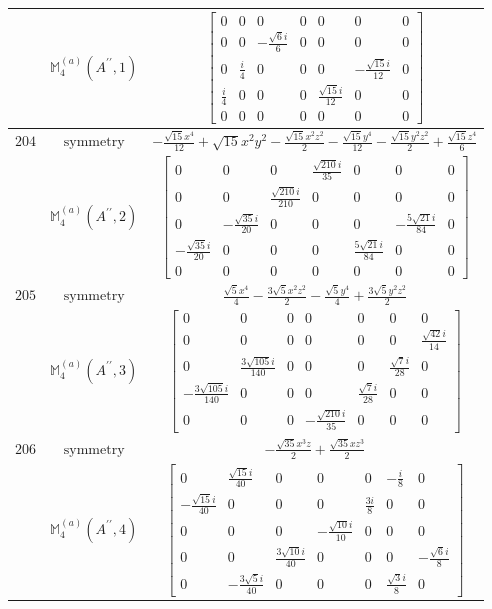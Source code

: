 \documentclass[fleqn,8pt,landscape]{jsarticle}
\begin{document}
\begin{longtable}{ccc}
$  $ & $ \mathbb{M}_{4}^{(a)}(A^{\prime\prime},1) $ & $ \begin{bmatrix} 0 & 0 & 0 & 0 & 0 & 0 & 0 \\ 0 & 0 & - \frac{\sqrt{6} i}{6} & 0 & 0 & 0 & 0 \\ 0 & \frac{i}{4} & 0 & 0 & 0 & - \frac{\sqrt{15} i}{12} & 0 \\ \frac{i}{4} & 0 & 0 & 0 & \frac{\sqrt{15} i}{12} & 0 & 0 \\ 0 & 0 & 0 & 0 & 0 & 0 & 0 \end{bmatrix} $ \\ \hline
$ 204 $ & $ \text{symmetry} $ & $ - \frac{\sqrt{15} x^{4}}{12} + \sqrt{15} x^{2} y^{2} - \frac{\sqrt{15} x^{2} z^{2}}{2} - \frac{\sqrt{15} y^{4}}{12} - \frac{\sqrt{15} y^{2} z^{2}}{2} + \frac{\sqrt{15} z^{4}}{6} $ \\
$  $ & $ \mathbb{M}_{4}^{(a)}(A^{\prime\prime},2) $ & $ \begin{bmatrix} 0 & 0 & 0 & \frac{\sqrt{210} i}{35} & 0 & 0 & 0 \\ 0 & 0 & \frac{\sqrt{210} i}{210} & 0 & 0 & 0 & 0 \\ 0 & - \frac{\sqrt{35} i}{20} & 0 & 0 & 0 & - \frac{5 \sqrt{21} i}{84} & 0 \\ - \frac{\sqrt{35} i}{20} & 0 & 0 & 0 & \frac{5 \sqrt{21} i}{84} & 0 & 0 \\ 0 & 0 & 0 & 0 & 0 & 0 & 0 \end{bmatrix} $ \\ \hline
$ 205 $ & $ \text{symmetry} $ & $ \frac{\sqrt{5} x^{4}}{4} - \frac{3 \sqrt{5} x^{2} z^{2}}{2} - \frac{\sqrt{5} y^{4}}{4} + \frac{3 \sqrt{5} y^{2} z^{2}}{2} $ \\
$  $ & $ \mathbb{M}_{4}^{(a)}(A^{\prime\prime},3) $ & $ \begin{bmatrix} 0 & 0 & 0 & 0 & 0 & 0 & 0 \\ 0 & 0 & 0 & 0 & 0 & 0 & \frac{\sqrt{42} i}{14} \\ 0 & \frac{3 \sqrt{105} i}{140} & 0 & 0 & 0 & \frac{\sqrt{7} i}{28} & 0 \\ - \frac{3 \sqrt{105} i}{140} & 0 & 0 & 0 & \frac{\sqrt{7} i}{28} & 0 & 0 \\ 0 & 0 & 0 & - \frac{\sqrt{210} i}{35} & 0 & 0 & 0 \end{bmatrix} $ \\ \hline
$ 206 $ & $ \text{symmetry} $ & $ - \frac{\sqrt{35} x^{3} z}{2} + \frac{\sqrt{35} x z^{3}}{2} $ \\
$  $ & $ \mathbb{M}_{4}^{(a)}(A^{\prime\prime},4) $ & $ \begin{bmatrix} 0 & \frac{\sqrt{15} i}{40} & 0 & 0 & 0 & - \frac{i}{8} & 0 \\ - \frac{\sqrt{15} i}{40} & 0 & 0 & 0 & \frac{3 i}{8} & 0 & 0 \\ 0 & 0 & 0 & - \frac{\sqrt{10} i}{10} & 0 & 0 & 0 \\ 0 & 0 & \frac{3 \sqrt{10} i}{40} & 0 & 0 & 0 & - \frac{\sqrt{6} i}{8} \\ 0 & - \frac{3 \sqrt{5} i}{40} & 0 & 0 & 0 & \frac{\sqrt{3} i}{8} & 0 \end{bmatrix} $ \\ \hline

\end{longtable}
\end{document}
